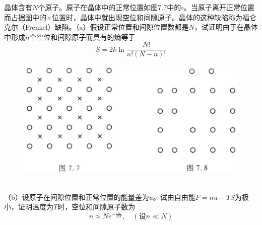 \documentclass[12pt,a4paper]{article}
\newenvironment{problem}[2][Problem]{\begin{trivlist}
\item[\hskip \labelsep {\bfseries #1}\hskip \labelsep {\bfseries #2.}]}{\end{trivlist}}
\begin{document}
\begin{problem}{7.6}
晶体含有$N$个原子。原子在晶体中的正常位置如图7.7中的\LARGE$\circ$。当原子离开正常位置而占据图中的$\times$位置时，晶体中就出现空位和间隙原子。晶体的这种缺陷称为福仑克尔（Frenkel）缺陷。（a）假设正常位置和间隙位置数都是$N$，试证明由于在晶体中形成$n$个空位和间隙原子而具有的熵等于
\[
S=2k\ln\frac{N!}{n!(N-n)!}
\]
\begin{figure}[h]
\centering
\includegraphics[scale=1]{fig7-7,8.png}
\end{figure}
\\（b）设原子在间隙位置和正常位置的能量差为$u$。试由自由能$F=nu-TS$为极小，证明温度为$T$时，空位和间隙原子数为
\[
n\approx Ne^{-\frac{u}{2kT}},\quad(\text{设}n\ll N)
\]
\end{problem}
\end{document}
